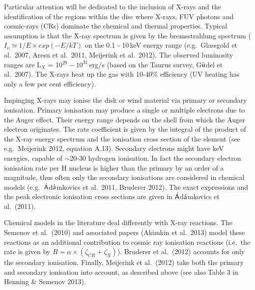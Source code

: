 \documentclass[10pt,fleqn,twoside]{article}
\begin{document}
Particular attention will be dedicated to the inclusion of X-rays and the identification of the regions within the disc where X-rays, FUV photons and cosmic-rays (CRs) dominate the chemical and thermal properties. Typical assumption is that the X-ray spectrum is given by the bremsstrahlung spectrum ($I_{\nu} \simeq 1/E \times exp(-E/kT)$ on the 0.1 - 10\,keV energy range (e.g.\ Glassgold et al.\ 2007, Aresu et al.\ 2011, Meijerink et al.\ 2012). The observed luminosity ranges are L$_X$ = 10$^{29} - 10^{31}$\,erg/s (based on the Taurus survey, G$\ddot{\textsf u}$del et al.\ 2007). The X-rays heat up the gas with 10-40\% efficiency (UV heating has only a few per cent efficiency). 

Impinging X-rays may ionise the disk or wind material via primary or secondary ionisation. Primary ionisation may produce a single or multiple electrons due to the Auger effect. Their energy range depends on the shell from which  the Auger electron originates. The rate coefficient is given by the integral of the product of the X-ray energy spectrum and the ionisation cross section of the element (see e.g.\ Meijerink 2012, equation A.13). Secondary electrons might have keV energies, capable of $\sim$20-30 hydrogen ionisation. In fact the secondary electron ionisation rate per H nucleus is higher than the primary by an order of a magnitude, thus often only the secondary ionisations are considered in chemical models (e.g.\ $\acute{\textsf A}$d$\acute{\textsf a}$mkovics et al.\ 2011, Bruderer 2012).
The exact expressions and the peak electronic ionisation cross sections are given in $\acute{\textsf A}$d$\acute{\textsf a}$mkovics et al.\ (2011). 

Chemical models in the literature deal differently with X-ray reactions. The Semenov et al.\ (2010) and associated papers (Akimkin et al.\ 2013) model these reactions as an additional contribution to cosmic ray ionisation reactions (i.e.\ the rate is given by $R = \alpha \times (\zeta_{CR} + \zeta_X)$). Bruderer et al.\ (2012) accounts for only the secondary ionisation. Finally, Meijerink et al.\ (2012) take both the primary and secondary ionisation into account, as described above (see also Table 3 in Henning \& Semenov 2013).
\end{document}
